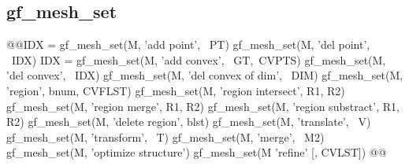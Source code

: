 \subsection{gf\_mesh\_set}
\begin{synopsis}
@@\tivec IDX = gf\_mesh\_set(M, 'add point', \tmat\ PT)
gf\_mesh\_set(M, 'del point', \tivec\ IDX)
\tvec IDX = gf\_mesh\_set(M, 'add convex', \tgeotrans\ GT,\tmat\ CVPTS)
gf\_mesh\_set(M, 'del convex', \tivec\ IDX)
gf\_mesh\_set(M, 'del convex of dim', \tivec\ DIM)
gf\_mesh\_set(M, 'region', \tint bnum, \timat CVFLST)
gf\_mesh\_set(M, 'region intersect', \tint R1, \tint R2)
gf\_mesh\_set(M, 'region merge', \tint R1, \tint R2)
gf\_mesh\_set(M, 'region substract', \tint R1, \tint R2)
gf\_mesh\_set(M, 'delete region', \tivec blst)
gf\_mesh\_set(M, 'translate', \tvec\ V)
gf\_mesh\_set(M, 'transform', \tmat\ T)
gf\_mesh\_set(M, 'merge', \tcmesh\ M2)
gf\_mesh\_set(M, 'optimize structure')
gf\_mesh\_set(M  'refine' [, \tmat CVLST])
@@\end{synopsis}
